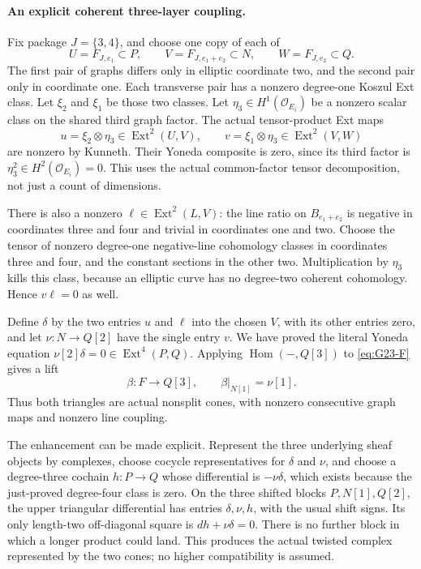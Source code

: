 \paragraph{An explicit coherent three-layer coupling.}
Fix package \(J=\{3,4\}\), and choose one copy of each of
\[
 U=F_{J,e_1}\subset P,\qquad
 V=F_{J,e_1+e_2}\subset N,\qquad
 W=F_{J,e_2}\subset Q.
\]
The first pair of graphs differs only in elliptic coordinate two,
and the second pair only in coordinate one. Each transverse pair
has a nonzero degree-one Koszul Ext class. Let \(\xi_2\) and
\(\xi_1\) be those two classes. Let
\(\eta_3\in H^1(\mathcal O_{E_i})\) be a nonzero scalar class
on the shared third graph factor. The actual tensor-product Ext maps
\[
        u=\xi_2\otimes\eta_3\in\operatorname{Ext}^2(U,V),
 \qquad v=\xi_1\otimes\eta_3\in\operatorname{Ext}^2(V,W)
\]
are nonzero by Kunneth. Their Yoneda composite is zero, since its
third factor is \(\eta_3^2\in H^2(\mathcal O_{E_i})=0\).
This uses the actual common-factor tensor decomposition, not just
a count of dimensions.

There is also a nonzero
\(\ell\in\operatorname{Ext}^2(L,V)\): the line ratio on
\(B_{e_1+e_2}\) is negative in coordinates three and four and
trivial in coordinates one and two. Choose the tensor of nonzero
degree-one negative-line cohomology classes in coordinates three
and four, and the constant sections in the other two. Multiplication
by \(\eta_3\) kills this class, because an elliptic curve has no
degree-two coherent cohomology. Hence \(v\ell=0\) as well.

Define \(\delta\) by the two entries \(u\) and \(\ell\)
into the chosen \(V\), with its other entries zero, and let
\(\nu:N\to Q[2]\) have the single entry \(v\). We have proved
the literal Yoneda equation
\(\nu[2]\delta=0\in\operatorname{Ext}^4(P,Q)\).
Applying \(\operatorname{Hom}(-,Q[3])\) to
\eqref{eq:G23-F} gives a lift
\[
 \beta:F\longrightarrow Q[3],\qquad
 \beta|_{N[1]}=\nu[1].
\]
Thus both triangles are actual nonsplit cones, with nonzero
consecutive graph maps and nonzero line coupling.

The enhancement can be made explicit. Represent the three underlying
sheaf objects by complexes, choose cocycle representatives for
\(\delta\) and \(\nu\), and choose a degree-three cochain
\(h:P\to Q\) whose differential is \(-\nu\delta\), which
exists because the just-proved degree-four class is zero.
On the three shifted blocks \(P,N[1],Q[2]\), the upper triangular
differential has entries \(\delta,\nu,h\), with the usual shift
signs. Its only length-two off-diagonal square is
\(dh+\nu\delta=0\). There is no further block in which a longer
product could land. This produces the actual twisted complex
represented by the two cones; no higher compatibility is assumed.

